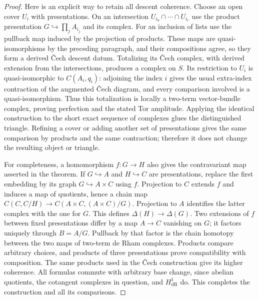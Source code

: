 \begin{proof}
Here is an explicit way to retain all descent coherence. Choose
an open cover $U_i$ with presentations. On an intersection
$U_{i_0}\cap\cdots\cap U_{i_r}$ use the product presentation
$G\hookrightarrow\prod_j A_{i_j}$ and its complex. For an
inclusion of lists use the pullback map induced by the projection
of products. These maps are quasi-isomorphisms by the preceding
paragraph, and their compositions agree, so they form a derived
\v Cech descent datum. Totalizing its \v Cech complex, with derived
extension from the intersections, produces a complex on $S$.
Its restriction to $U_i$ is quasi-isomorphic to $C(A_i,q_i)$:
adjoining the index $i$ gives the usual extra-index contraction
of the augmented \v Cech diagram, and every comparison involved
is a quasi-isomorphism. Thus this totalization is locally a
two-term vector-bundle complex, proving perfection and the stated
Tor amplitude. Applying the identical construction to the short
exact sequence of complexes glues the distinguished triangle.
Refining a cover or adding another set of presentations gives
the same comparison by products and the same contraction;
therefore it does not change the resulting object or triangle.

For completeness, a homomorphism $f:G\to H$ also gives the
contravariant map asserted in the theorem. If $G\hookrightarrow A$
and $H\hookrightarrow C$ are presentations, replace the first
embedding by its graph $G\hookrightarrow A\times C$ using $f$.
Projection to $C$ extends $f$ and induces a map of quotients, hence
a chain map $C(C,C/H)\to C(A\times C,(A\times C)/G)$.
Projection to $A$ identifies the latter complex with the one for
$G$. This defines $\Delta(H)\to\Delta(G)$.
Two extensions of $f$ between fixed presentations differ by a map
$A\to C$ vanishing on $G$; it factors uniquely through $B=A/G$.
Pullback by that factor is the chain homotopy between the two
maps of two-term de Rham complexes. Products compare arbitrary
choices, and products of three presentations prove compatibility
with composition. The same products used in the \v Cech
construction give its higher coherence. All formulas commute
with arbitrary base change, since abelian quotients, the
cotangent complexes in question, and $H^1_{\mathrm{dR}}$ do.
This completes the construction and all its comparisons.
\end{proof}

